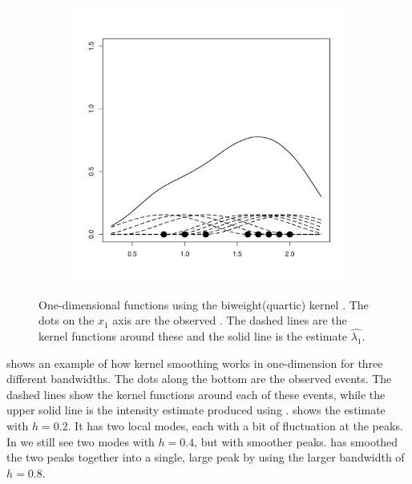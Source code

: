 \begin{figure}[H]
\begin{subfigure}[t]{0.32\textwidth}
        \label{fig:theory:kernel1d:04}
    \end{subfigure}
    \begin{subfigure}[t]{0.32\textwidth}
        \includegraphics[width=\textwidth]{img/kernel1d-08}
        \label{fig:theory:kernel1d:08}
    \end{subfigure}
    \caption[One-dimensional  functions]
        {One-dimensional  functions using the biweight(quartic) kernel \citep{silverman1986density}.
        The dots on the $x_1$ axis are the observed .
        The dashed lines are the kernel functions around these 
        and the solid line is the  estimate $\hat{\lambda_1}$.}
    \label{fig:theory:kernel1d}
\end{figure}

 shows an example of how \gls{kernel} smoothing works in  one-dimension for three different bandwidths.
The dots along the bottom are the observed \glspl{event}.
The dashed lines show the \gls{kernel} functions around each of these \glspl{event},
while the upper solid line is the \gls{intensity} estimate produced using .
 shows the estimate with $h=0.2$.
It has two local modes, each with a bit of fluctuation at the peaks.
In  we still see two modes with $h=0.4$, but with smoother peaks.
 has smoothed the two peaks together into a single,
large peak by using the larger bandwidth of $h=0.8$.

